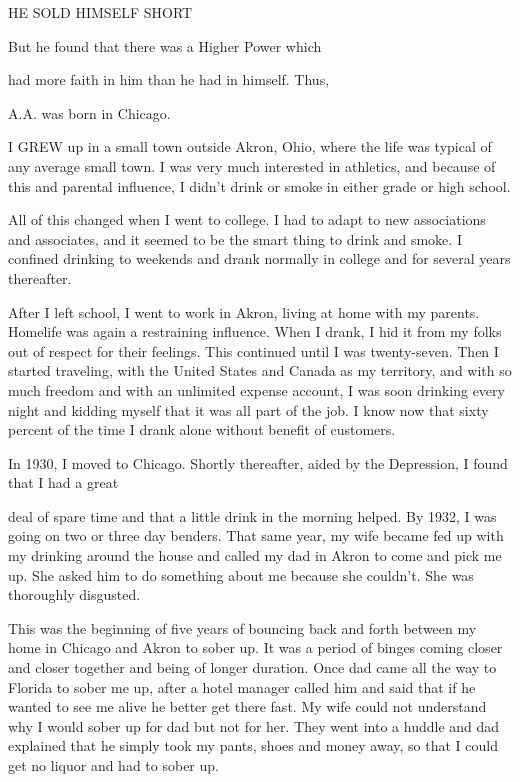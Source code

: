 

HE SOLD HIMSELF SHORT

But he found that there was a Higher Power which

had more faith in him than he had in himself. Thus,

A.A. was born in Chicago.

 

      I GREW up in a small town outside Akron, Ohio, where the life was typical of any average small town. I was very much interested in athletics, and because of this and parental influence, I didn’t drink or smoke in either grade or high school.

All of this changed when I went to college. I had to adapt to new associations and associates, and it seemed to be the smart thing to drink and smoke. I confined drinking to weekends and drank normally in college and for several years thereafter.

After I left school, I went to work in Akron, living at home with my parents. Homelife was again a restraining influence. When I drank, I hid it from my folks out of respect for their feelings. This continued until I was twenty-seven. Then I started traveling, with the United States and Canada as my territory, and with so much freedom and with an unlimited expense account, I was soon drinking every night and kidding myself that it was all part of the job. I know now that sixty percent of the time I drank alone without benefit of customers.

In 1930, I moved to Chicago. Shortly thereafter, aided by the Depression, I found that I had a great

deal of spare time and that a little drink in the morning helped. By 1932, I was going on two or three day benders. That same year, my wife became fed up with my drinking around the house and called my dad in Akron to come and pick me up. She asked him to do something about me because she couldn’t. She was thoroughly disgusted.

This was the beginning of five years of bouncing back and forth between my home in Chicago and Akron to sober up. It was a period of binges coming closer and closer together and being of longer duration. Once dad came all the way to Florida to sober me up, after a hotel manager called him and said that if he wanted to see me alive he better get there fast. My wife could not understand why I would sober up for dad but not for her. They went into a huddle and dad explained that he simply took my pants, shoes and money away, so that I could get no liquor and had to sober up.

